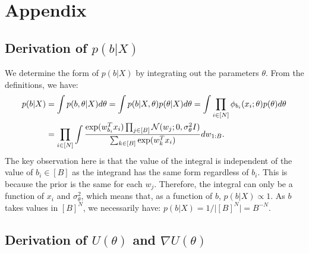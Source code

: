\section{Appendix}

\subsection{Derivation of {\boldmath $p(b|X)$}}
\label{appdx:b|x}

We determine the form of $p(b| X)$ by integrating
out the parameters $\theta$. From the definitions, we have:
%
\begin{align*}
	p(b | X) 
	&= \int p(b , \theta| X) d\theta 
	= \int p(b | X, \theta) p(\theta | X) d\theta
	= \int \prod_{i \in [N] } \phi_{b_i}(x_i; \theta) p(\theta) d\theta \\
	&= \prod_{i \in [N]} \int \frac{\exp(w_{b_i}^T x_i) \prod_{j \in [B]} \mathcal{N}(w_j; 0, \sigma_\theta^2 I)}{\sum_{k \in [B]} \exp(w_{k}^T x_i)} dw_{1:B}.
\end{align*}
%
The key observation here is that 
the value of the integral is independent
of the value of $b_i \in [B]$ as
the integrand has the same form regardless of $b_i$. This is
because the prior is the same for each $w_j$. 
Therefore, the integral can only be a function of $x_i$ and $\sigma_\theta^2$,
which means that, as a function of $b$, $p(b|X)\propto 1$. As
$b$ takes values in $[B]^N$, we necessarily have:
$p(b | X) =1/\big|[B]^N\big|=B^{-N}$.

\subsection{Derivation of {\boldmath $U(\theta)$} and {\boldmath $\nabla U(\theta)$}}
\label{appdx:form-U}

